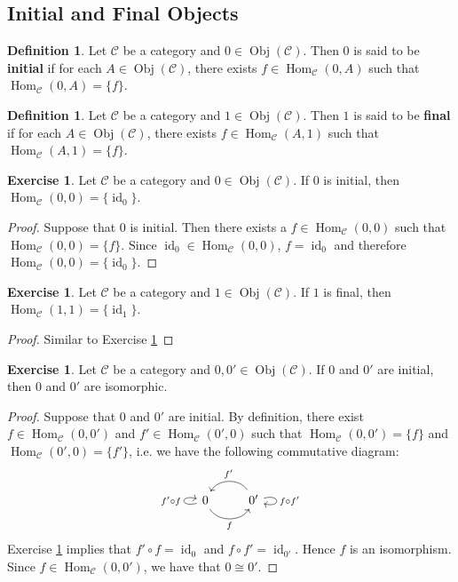 \documentclass{book}
\theoremstyle{definition}
\newtheorem{defn}[definition]{Definition}
\newtheorem{ex}[definition]{Exercise}
\newcommand{\MC}{\mathcal{C}}
\newcommand{\lex}[1]{\label{ex:#1}}
\newcommand{\rex}[1]{Exercise \ref{ex:#1}}
\newcommand{\ld}[1]{\label{defn:#1}}
\DeclareMathOperator{\id}{id}
\DeclareMathOperator{\Obj}{Obj}
\DeclareMathOperator{\Hom}{Hom}
\DeclareMathOperator*{\0}{\mbf{0}}
\DeclareMathOperator*{\1}{\mbf{1}}
\begin{document}
	\subsection{Initial and Final Objects}
	
	\begin{defn} \ld{15012}
		Let $\MC$ be a category and $0 \in \Obj(\MC)$. Then $0$ is said to be \textbf{initial} if for each $A \in \Obj(\MC)$, there exists $f \in \Hom_{\MC}(0, A)$ such that $\Hom_{\MC}(0, A) = \{f\}$. 
	\end{defn}

	\begin{defn} \ld{15012.1}
		Let $\MC$ be a category and $1 \in \Obj(\MC)$. Then $1$ is said to be \textbf{final} if for each $A \in \Obj(\MC)$, there exists $f \in \Hom_{\MC}(A, 1)$ such that $\Hom_{\MC}(A, 1) = \{f\}$. 
	\end{defn}
	
	\begin{ex} \lex{15013}
		Let $\MC$ be a category and $0 \in \Obj(\MC)$. If $0$ is initial, then $\Hom_{\MC}(0, 0) = \{\id_0\}$.
	\end{ex}
	
	\begin{proof}
		Suppose that $0$ is initial. Then there exists a $f \in \Hom_{\MC}(0,0)$ such that $\Hom_{\MC}(0, 0) = \{f\}$. Since $\id_0 \in \Hom_{\MC}(0,0)$, $f = \id_0$ and therefore $\Hom_{\MC}(0, 0) = \{\id_0\}$.
	\end{proof}

		\begin{ex} \lex{15013.1}
		Let $\MC$ be a category and $1 \in \Obj(\MC)$. If $1$ is final, then $\Hom_{\MC}(1, 1) = \{\id_1\}$.
	\end{ex}
	
	\begin{proof}
		Similar to \rex{15013}
	\end{proof}
	
	\begin{ex} \lex{15014}
		Let $\MC$ be a category and $0, 0' \in \Obj(\MC)$. If $0$ and $0'$ are initial, then $0$ and $0'$ are isomorphic.
	\end{ex}
	
	\begin{proof}
		Suppose that $0$ and $0'$ are initial. By definition, there exist $f \in \Hom_{\MC}(0, 0')$ and $f' \in \Hom_{\MC}(0', 0)$ such that $\Hom_{\MC}(0, 0') = \{f\}$ and $\Hom_{\MC}(0', 0) = \{f'\}$, i.e. we have the following commutative diagram:
		\[ 
		\begin{tikzcd}[baseline= 7]
			\arrow[loop left, "f' \circ f"] 0 \arrow[r, bend right= 60, "f", swap] & 0' \arrow[l, bend left=-60, "f'", swap] \arrow[loop right, "f \circ f'"] \\
		\end{tikzcd}
		\]
		\rex{15013} implies that $f' \circ f = \id_{0}$ and $f \circ f' = \id_{0'}$. Hence $f$ is an isomorphism. Since $f \in \Hom_{\MC}(0, 0')$, we have that $0 \cong 0'$.
	\end{proof}
\end{document}
